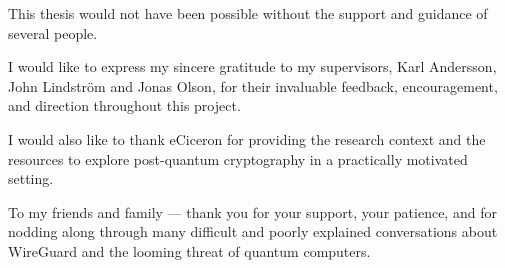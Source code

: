 This thesis would not have been possible without the support and guidance of several people.

I would like to express my sincere gratitude to my supervisors, Karl Andersson, John Lindström and Jonas Olson, for their invaluable feedback, encouragement, and direction throughout this project.

I would also like to thank eCiceron for providing the research context and the resources to explore post-quantum cryptography in a practically motivated setting. 

To my friends and family — thank you for your support, your patience, and for nodding along through many difficult and poorly explained conversations about WireGuard and the looming threat of quantum computers.